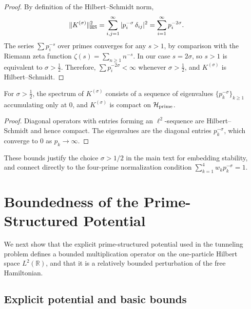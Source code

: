 \documentclass[11pt]{article}
\begin{document}
\begin{proof}
By definition of the Hilbert--Schmidt norm,
\begin{equation}
  \|K^{(\sigma)}\|_{\rm HS}^2
  = \sum_{i,j=1}^\infty |p_i^{-\sigma}\,\delta_{ij}|^2
  = \sum_{i=1}^\infty p_i^{-2\sigma}.
\end{equation}
The series \(\sum p_i^{-s}\) over primes converges for any
\(s>1\), by comparison with the Riemann zeta function
\(\zeta(s) = \sum_{n\ge 1} n^{-s}\). In our case \(s=2\sigma\), so
\(s>1\) is equivalent to \(\sigma > \tfrac{1}{2}\). Therefore,
\(\sum p_i^{-2\sigma}<\infty\) whenever \(\sigma>\tfrac{1}{2}\), and
\(K^{(\sigma)}\) is Hilbert--Schmidt.
\end{proof}

\begin{corollary}
For \(\sigma>\tfrac{1}{2}\), the spectrum of \(K^{(\sigma)}\) consists
of a sequence of eigenvalues \(\{p_k^{-\sigma}\}_{k\ge 1}\) accumulating
only at \(0\), and \(K^{(\sigma)}\) is compact on \(\mathcal{H}_{\rm prime}\).
\end{corollary}

\begin{proof}
Diagonal operators with entries forming an \(\ell^2\)-sequence are
Hilbert--Schmidt and hence compact. The eigenvalues are the diagonal
entries \(p_k^{-\sigma}\), which converge to \(0\) as \(p_k\to\infty\).
\end{proof}

These bounds justify the choice \(\sigma>1/2\) in the main text for
embedding stability, and connect directly to the four-prime
normalization condition
\(\sum_{k=1}^{4} w_k p_k^{-\sigma} = 1\).

\section{Boundedness of the Prime-Structured Potential}

We next show that the explicit prime-structured potential used in the
tunneling problem defines a bounded multiplication operator on the
one-particle Hilbert space \(L^2(\mathbb{R})\), and that it is a
relatively bounded perturbation of the free Hamiltonian.

\subsection{Explicit potential and basic bounds}
\end{document}
